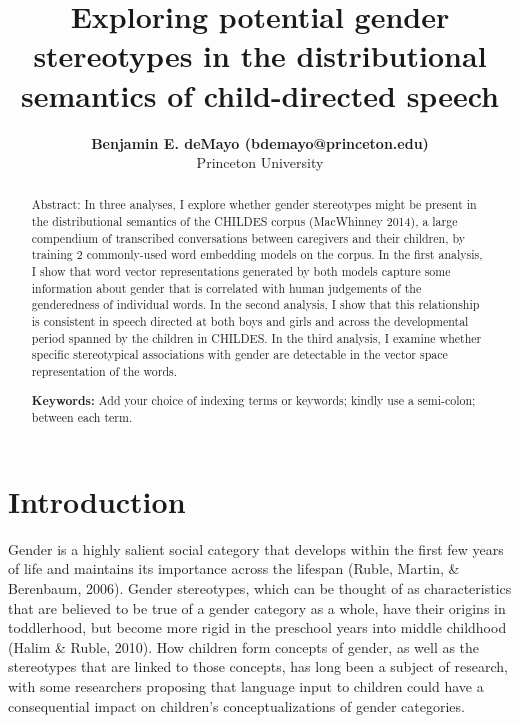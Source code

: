 \documentclass[10pt, letterpaper]{article}
\title{Exploring potential gender stereotypes in the distributional
semantics of child-directed speech}
\author{{\large \bf Benjamin E. deMayo (bdemayo@princeton.edu)} \\ Princeton University}
\begin{document}
\maketitle

\begin{abstract}
Abstract: In three analyses, I explore whether gender stereotypes might
be present in the distributional semantics of the CHILDES corpus
(MacWhinney 2014), a large compendium of transcribed conversations
between caregivers and their children, by training 2 commonly-used word
embedding models on the corpus. In the first analysis, I show that word
vector representations generated by both models capture some information
about gender that is correlated with human judgements of the
genderedness of individual words. In the second analysis, I show that
this relationship is consistent in speech directed at both boys and
girls and across the developmental period spanned by the children in
CHILDES. In the third analysis, I examine whether specific stereotypical
associations with gender are detectable in the vector space
representation of the words.

\textbf{Keywords:}
Add your choice of indexing terms or keywords; kindly use a semi-colon;
between each term.
\end{abstract}

\hypertarget{introduction}{%
\section{Introduction}\label{introduction}}

Gender is a highly salient social category that develops within the
first few years of life and maintains its importance across the lifespan
(Ruble, Martin, \& Berenbaum, 2006). Gender stereotypes, which can be
thought of as characteristics that are believed to be true of a gender
category as a whole, have their origins in toddlerhood, but become more
rigid in the preschool years into middle childhood (Halim \& Ruble,
2010). How children form concepts of gender, as well as the stereotypes
that are linked to those concepts, has long been a subject of research,
with some researchers proposing that language input to children could
have a consequential impact on children's conceptualizations of gender
categories.
\end{document}
